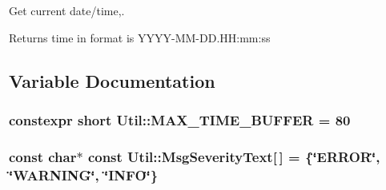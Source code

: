 Get current date/time,. 

\begin{DoxyReturn}{Returns}
time in format is Y\+Y\+Y\+Y-\/\+M\+M-\/\+D\+D.\+HH\+:mm\+:ss 
\end{DoxyReturn}


\subsection{Variable Documentation}
\subsubsection[{\texorpdfstring{M\+A\+X\+\_\+\+T\+I\+M\+E\+\_\+\+B\+U\+F\+F\+ER}{MAX_TIME_BUFFER}}]{\setlength{\rightskip}{0pt plus 5cm}constexpr short Util\+::\+M\+A\+X\+\_\+\+T\+I\+M\+E\+\_\+\+B\+U\+F\+F\+ER = 80}\hypertarget{namespace_util_a8dfc55b47c7119cc05aecc5eeb480e95}{}\label{namespace_util_a8dfc55b47c7119cc05aecc5eeb480e95}
\subsubsection[{\texorpdfstring{Msg\+Severity\+Text}{MsgSeverityText}}]{\setlength{\rightskip}{0pt plus 5cm}const char$\ast$ const Util\+::\+Msg\+Severity\+Text\mbox{[}$\,$\mbox{]} = \{\char`\"{}E\+R\+R\+OR\char`\"{}, \char`\"{}{\bf W\+A\+R\+N\+I\+NG}\char`\"{}, \char`\"{}{\bf I\+N\+FO}\char`\"{}\}}\hypertarget{namespace_util_a7a3d115a18e867870f3f12beceb10a74}{}\label{namespace_util_a7a3d115a18e867870f3f12beceb10a74}

